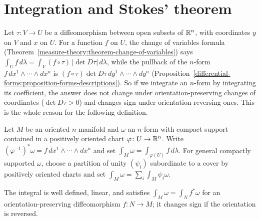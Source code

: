 \section{Integration and Stokes' theorem}\label{differential-forms:section-integration}

Let $\tau \colon V \to U$ be a diffeomorphism between open subsets of $\mathbb{R}^n$, with coordinates $y$ on $V$ and $x$ on $U$. For a function $f$ on $U$, the change of variables formula
(Theorem~\ref{measure-theory:theorem-change-of-variables}) says $\int_Uf\,d\lambda = \int_V(f \circ \tau)\,|\det D\tau|\,d\lambda$, while the pullback of the $n$-form $f\,dx^1 \wedge \cdots \wedge dx^n$
is $(f \circ \tau)\det D\tau\,dy^1 \wedge \cdots \wedge dy^n$ (Proposition~\ref{differential-forms:proposition-forms-descriptions}). So if we integrate an $n$-form by integrating its coefficient,
the answer does not change under orientation-preserving changes of coordinates ($\det D\tau > 0$) and changes sign under orientation-reversing ones. This is the whole reason for
the following definition.

\begin{definition}\label{differential-forms:definition-integral}
Let $M$ be an oriented $n$-manifold and $\omega$ an $n$-form with compact support contained in a positively oriented chart $\varphi \colon U \to \mathbb{R}^n$. Write $(\varphi^{-1})^*\omega = f\,dx^1 \wedge \cdots \wedge dx^n$
and set $\int_M\omega = \int_{\varphi(U)}f\,d\lambda$. For general compactly supported $\omega$, choose a partition of unity $(\psi_i)$ subordinate to a cover by positively oriented charts and set
$\int_M\omega = \sum_i\int_M\psi_i\omega$.
\end{definition}

\begin{proposition}\label{differential-forms:proposition-integral-well-defined}
The integral is well defined, linear, and satisfies $\int_M\omega = \int_N f^*\omega$ for an orientation-preserving diffeomorphism $f \colon N \to M$; it changes sign if the orientation is reversed.
\end{proposition}


